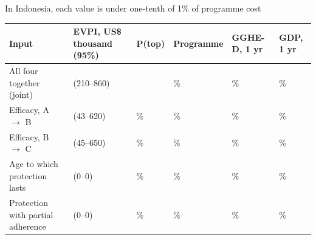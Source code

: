 \documentclass[
  ignorenonframetext,
  aspectratio=169]{beamer}
\newcommand{\sourceline}[1]{\par\vspace{4pt}{\footnotesize\raggedright\textcolor{black!60}{#1}\par}}
\begin{document}
\begin{frame}{In Indonesia, each value is under one-tenth of 1\% of
programme cost}
\label{in-indonesia-each-value-is-under-one-tenth-of-1-of-programme-cost}
\setlength{\tabcolsep}{3pt}

\begin{table}
\centering\begingroup\fontsize{10}{12}\selectfont

\begin{tabular}[t]{>{\raggedright\arraybackslash}p{3.4cm}>{\raggedleft\arraybackslash}p{2.9cm}>{\raggedleft\arraybackslash}p{1.1cm}>{\raggedleft\arraybackslash}p{1.6cm}>{\raggedleft\arraybackslash}p{1.6cm}>{\raggedleft\arraybackslash}p{1.8cm}}
\toprule
Input & EVPI, US\$ thousand (95\%) & P(top) & Programme & GGHE-D, 1 yr & GDP, 1 yr\\
\midrule
All four together (joint) & 500 (210--860) &  & 0.073\% & 0.0026\% & 0.000038\%\\
Efficacy, A $\rightarrow$ B & 270 (43--620) & 37.4\% & 0.039\% & 0.0014\% & 0.000020\%\\
Efficacy, B $\rightarrow$ C & 280 (45--650) & 62.4\% & 0.041\% & 0.0015\% & 0.000021\%\\
Age to which protection lasts & 0 (0--0) & 0.0\% & 0\% & 0\% & 0\%\\
Protection with partial adherence & 0 (0--0) & 0.0\% & 0\% & 0\% & 0\%\\
\bottomrule
\end{tabular}
\endgroup{}
\end{table}

\sourceline{VSL $\times$ 1, 2026--2050, constant 2025 US\$. P(top): share of bootstrap replicates in which the input alone ranks first. Shares use one fixed denominator for estimate and bounds. Joint EVPI / expected incremental cost (US\$91.5m): 0.54\%.}
\end{frame}
\end{document}
